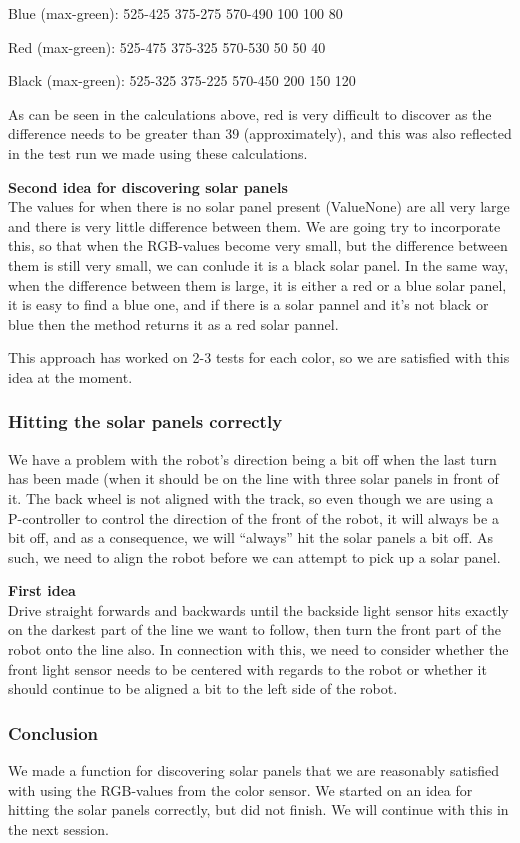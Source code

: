 Blue (max-green): 525-425 375-275 570-490 \textbar{} 100 100 80

Red (max-green): 525-475 375-325 570-530 \textbar{} 50 50 40

Black (max-green): 525-325 375-225 570-450 \textbar{} 200 150 120

As can be seen in the calculations above, red is very difficult to
discover as the difference needs to be greater than 39 (approximately),
and this was also reflected in the test run we made using these
calculations.

\textbf{Second idea for discovering solar panels}\\The values for when
there is no solar panel present (ValueNone) are all very large and there
is very little difference between them. We are going try to incorporate
this, so that when the RGB-values become very small, but the difference
between them is still very small, we can conlude it is a black solar
panel. In the same way, when the difference between them is large, it is
either a red or a blue solar panel, it is easy to find a blue one, and
if there is a solar pannel and it's not black or blue then the method
returns it as a red solar pannel.

This approach has worked on 2-3 tests for each color, so we are
satisfied with this idea at the moment.

\subsubsection{Hitting the solar panels correctly}

We have a problem with the robot's direction being a bit off when the
last turn has been made (when it should be on the line with three solar
panels in front of it. The back wheel is not aligned with the track, so
even though we are using a P-controller to control the direction of the
front of the robot, it will always be a bit off, and as a consequence,
we will ``always'' hit the solar panels a bit off. As such, we need to
align the robot before we can attempt to pick up a solar panel.

\textbf{First idea}\\Drive straight forwards and backwards until the
backside light sensor hits exactly on the darkest part of the line we
want to follow, then turn the front part of the robot onto the line
also. In connection with this, we need to consider whether the front
light sensor needs to be centered with regards to the robot or whether
it should continue to be aligned a bit to the left side of the robot.

\subsubsection{Conclusion}

We made a function for discovering solar panels that we are reasonably
satisfied with using the RGB-values from the color sensor. We started on
an idea for hitting the solar panels correctly, but did not finish. We
will continue with this in the next session.
